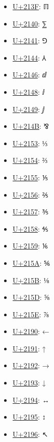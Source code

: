 \begin{itemize}
	\item \href{https://decodeunicode.org/en/u+213F}{U+213F}: ℿ
	\item \href{https://decodeunicode.org/en/u+2140}{U+2140}: ⅀
	\item \href{https://decodeunicode.org/en/u+2141}{U+2141}: ⅁
	\item \href{https://decodeunicode.org/en/u+2144}{U+2144}: ⅄
	\item \href{https://decodeunicode.org/en/u+2146}{U+2146}: ⅆ
	\item \href{https://decodeunicode.org/en/u+2148}{U+2148}: ⅈ
	\item \href{https://decodeunicode.org/en/u+2149}{U+2149}: ⅉ
	\item \href{https://decodeunicode.org/en/u+214B}{U+214B}: ⅋
	\item \href{https://decodeunicode.org/en/u+2153}{U+2153}: ⅓
	\item \href{https://decodeunicode.org/en/u+2154}{U+2154}: ⅔
	\item \href{https://decodeunicode.org/en/u+2155}{U+2155}: ⅕
	\item \href{https://decodeunicode.org/en/u+2156}{U+2156}: ⅖
	\item \href{https://decodeunicode.org/en/u+2157}{U+2157}: ⅗
	\item \href{https://decodeunicode.org/en/u+2158}{U+2158}: ⅘
	\item \href{https://decodeunicode.org/en/u+2159}{U+2159}: ⅙
	\item \href{https://decodeunicode.org/en/u+215A}{U+215A}: ⅚
	\item \href{https://decodeunicode.org/en/u+215B}{U+215B}: ⅛
	\item \href{https://decodeunicode.org/en/u+215D}{U+215D}: ⅝
	\item \href{https://decodeunicode.org/en/u+215E}{U+215E}: ⅞
	\item \href{https://decodeunicode.org/en/u+2190}{U+2190}: ←
	\item \href{https://decodeunicode.org/en/u+2191}{U+2191}: ↑
	\item \href{https://decodeunicode.org/en/u+2192}{U+2192}: →
	\item \href{https://decodeunicode.org/en/u+2193}{U+2193}: ↓
	\item \href{https://decodeunicode.org/en/u+2194}{U+2194}: ↔
	\item \href{https://decodeunicode.org/en/u+2195}{U+2195}: ↕
	\item \href{https://decodeunicode.org/en/u+2196}{U+2196}: ↖

\end{itemize}
